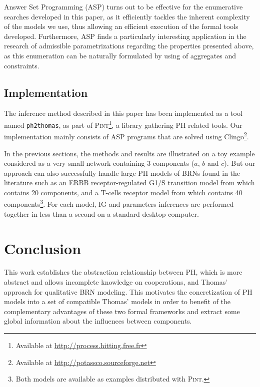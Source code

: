 \documentclass[11pt,a4paper,twoside]{epig}
\newcounter{la}
\begin{document}
Answer Set Programming (ASP) \cite{Baral03} turns out to be effective for the enumerative searches developed in this paper,
as it efficiently tackles the inherent complexity of the models we use, thus allowing an efficient execution of the formal tools developed.
Furthermore, ASP finds a particularly interesting application in the research of admissible parametrizations regarding the properties presented above, as this enumeration can be naturally formulated by using of aggregates and constraints.

%
\subsection{Implementation}\label{ssec:examples}
The inference method described in this paper has been implemented as a tool named \texttt{ph2thomas}, as part of
\textsc{Pint}\footnote{Available at \url{http://process.hitting.free.fr}}, a library gathering PH related
tools.
Our implementation mainly consists of ASP programs that are solved using Clingo\footnote{Available
at \url{http://potassco.sourceforge.net}}.

In the previous sections, the methods and results are illustrated on a toy example considered as a very small network containing 3 components ($a$, $b$ and $c$).
But our approach can also successfully handle large PH models of BRNs found in the literature
such as an ERBB receptor-regulated G1/S transition model from \cite{Sahin09} which contains 20
components, and a T-cells receptor model from \cite{Klamt06} which contains 40
components\footnote{Both models are available as examples distributed with \textsc{Pint}.}.
For each model, IG and parameters inferences are performed together in less than a second
on a standard desktop computer.



%
\section{Conclusion}

This work establishes the abstraction relationship between PH, which is more abstract and allows incomplete knowledge on cooperations, and Thomas' approach for qualitative BRN modeling.
This motivates the concretization of PH models into a set of compatible Thomas' models in order to benefit of the complementary advantages of these two formal frameworks and extract some global information about the influences between components.
\end{document}
